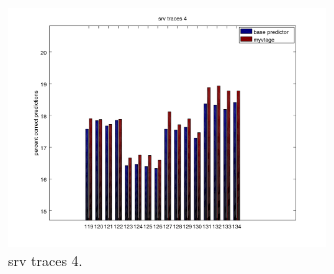 \documentclass[12pt]{article}
\begin{document}
	\begin{figure}[p]
		\centering
		\includegraphics[width=0.75\textwidth]{srvtraces4.png}
		\caption{srv traces 4.}
		\label{fig:srv4}
	\end{figure}
\end{document}

